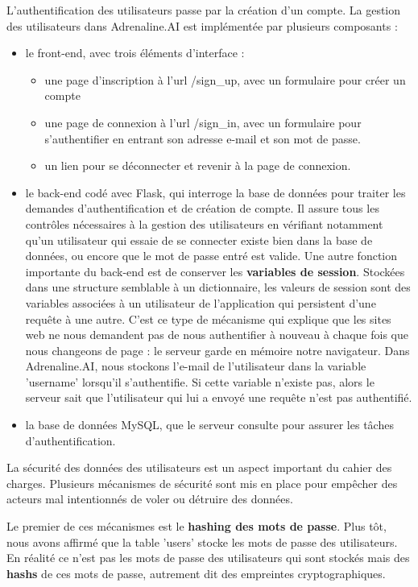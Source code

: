 \documentclass[french]{article}
\begin{document}
    L'authentification des utilisateurs passe par la création d'un compte. La gestion des utilisateurs dans Adrenaline.AI est implémentée par plusieurs composants :
    \begin{itemize}
        \item le front-end, avec trois éléments d'interface :
        \begin{itemize}
            \item une page d'inscription à l'url /sign\_up, avec un formulaire pour créer un compte
            \item une page de connexion à l'url /sign\_in, avec un formulaire pour s'authentifier en entrant son adresse e-mail et son mot de passe.
            \item un lien pour se déconnecter et revenir à la page de connexion.
        \end{itemize}
        \item le back-end codé avec Flask, qui interroge la base de données pour traiter les demandes d'authentification et de création de compte. Il assure tous les contrôles nécessaires à la gestion des utilisateurs en vérifiant notamment qu'un utilisateur qui essaie de se connecter existe bien dans la base de données, ou encore que le mot de passe entré est valide. Une autre fonction importante du back-end est de conserver les \textbf{variables de session}. Stockées dans une structure semblable à un dictionnaire, les valeurs de session sont des variables associées à un utilisateur de l'application qui persistent d'une requête à une autre. C'est ce type de mécanisme qui explique que les sites web ne nous demandent pas de nous authentifier à nouveau à chaque fois que nous changeons de page : le serveur garde en mémoire notre navigateur. Dans Adrenaline.AI, nous stockons l'e-mail de l'utilisateur dans la variable 'username' lorsqu'il s'authentifie. Si cette variable n'existe pas, alors le serveur sait que l'utilisateur qui lui a envoyé une requête n'est pas authentifié.
        \item la base de données MySQL, que le serveur consulte pour assurer les tâches d'authentification.
    \end{itemize}

    La sécurité des données des utilisateurs est un aspect important du cahier des charges. Plusieurs mécanismes de sécurité sont mis en place pour empêcher des acteurs mal intentionnés de voler ou détruire des données.

    Le premier de ces mécanismes est le \textbf{hashing des mots de passe}. Plus tôt, nous avons affirmé que la table 'users' stocke les mots de passe des utilisateurs. En réalité ce n'est pas les mots de passe des utilisateurs qui sont stockés mais des \textbf{hashs} de ces mots de passe, autrement dit des empreintes cryptographiques.
\end{document}
